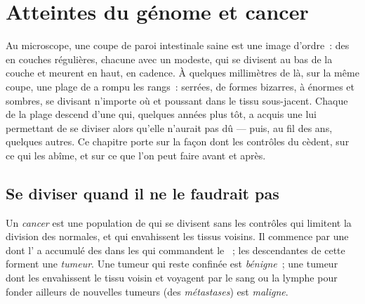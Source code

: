 \chapter{Atteintes du génome et cancer}\label{ch:g11:cancer}

Au microscope, une coupe de paroi intestinale saine est une image
d'ordre~: des  en couches régulières, chacune avec un 
modeste, qui se divisent au bas de la couche et meurent en haut, en
cadence. À quelques millimètres de là, sur la même coupe, une plage de
 a rompu les rangs~: serrées, de formes bizarres, à 
énormes et sombres, se divisant n'importe où et poussant dans le tissu
sous-jacent. Chaque  de la plage descend d'une  qui,
quelques années plus tôt, a acquis une  lui permettant de se
diviser alors qu'elle n'aurait pas dû --- puis, au fil des ans,
quelques autres. Ce chapitre porte sur la façon dont les contrôles du
 cèdent, sur ce qui les abîme, et sur ce que l'on peut
faire avant et après.

\section{Se diviser quand il ne le faudrait pas}

\begin{definition}[Cancer]\label{def:g11:cancer:cancer}
Un \emph{cancer} est une population de  qui se
divisent sans les contrôles qui limitent la division des 
normales, et qui envahissent les tissus voisins. Il commence par une
 dont l' a accumulé des  dans les  qui
commandent le ~; les descendantes de cette 
forment une \emph{tumeur}. Une tumeur qui reste confinée
est \emph{bénigne}~; une tumeur dont les  envahissent le tissu
voisin et voyagent par le sang ou la lymphe pour fonder ailleurs de
nouvelles tumeurs (des \emph{métastases}) est \emph{maligne}.
\end{definition}

